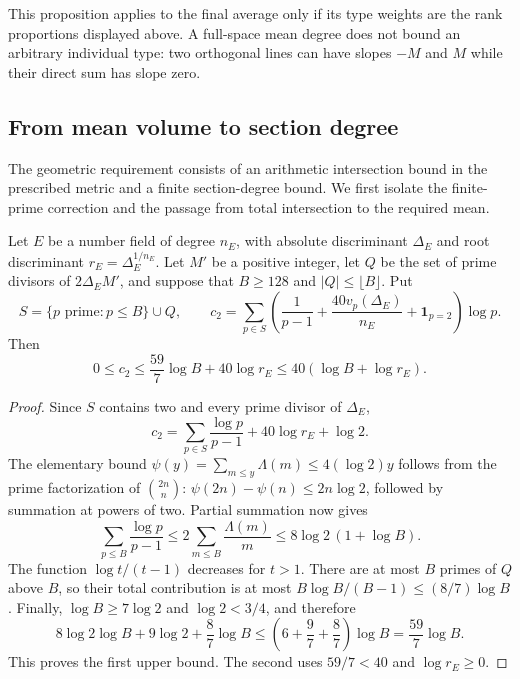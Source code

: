 This proposition applies to the final average only if its type weights
are the rank proportions displayed above. A full-space mean degree
does not bound an arbitrary individual type: two orthogonal lines can
have slopes $-M$ and $M$ while their direct sum has slope zero.














\subsection{From mean volume to section degree}

The geometric requirement consists of an arithmetic intersection bound
in the prescribed metric and a finite section-degree bound. We first
isolate the finite-prime correction and the passage from total
intersection to the required mean.

\begin{lemma}
\label{cs-mean-volume-prime-cost}
Let $E$ be a number field of degree $n_E$, with absolute discriminant
$\Delta_E$ and root discriminant $r_E=\Delta_E^{1/n_E}$. Let $M'$ be a
positive integer, let $Q$ be the set of prime divisors of $2\Delta_E M'$,
and suppose that $B\ge128$ and $|Q|\le\lfloor B\rfloor$. Put
\[
 S=\{p\text{ prime}:p\le B\}\cup Q,\qquad
 c_2=\sum_{p\in S}\left(\frac1{p-1}
       +\frac{40v_p(\Delta_E)}{n_E}+\mathbf1_{p=2}\right)\log p.
\]
Then
\begin{equation}
\label{eq:mean-volume-prime-cost}
 0\le c_2\le\frac{59}{7}\log B+40\log r_E
                      \le40(\log B+\log r_E).
\end{equation}
\end{lemma}

\begin{proof}
Since $S$ contains two and every prime divisor of $\Delta_E$,
\[
 c_2=\sum_{p\in S}\frac{\log p}{p-1}+40\log r_E+\log2.
\]
The elementary bound $\psi(y)=\sum_{m\le y}\Lambda(m)\le4(\log2)y$
follows from the prime factorization of $\binom{2n}{n}$:
$\psi(2n)-\psi(n)\le2n\log2$, followed by summation at powers of two.
Partial summation now gives
\[
 \sum_{p\le B}\frac{\log p}{p-1}
 \le2\sum_{m\le B}\frac{\Lambda(m)}m
 \le8\log2\,(1+\log B).
\]
The function $\log t/(t-1)$ decreases for $t>1$. There are at most
$B$ primes of $Q$ above $B$, so their total contribution is at most
$B\log B/(B-1)\le(8/7)\log B$. Finally,
$\log B\ge7\log2$ and $\log2<3/4$, and therefore
\[
 8\log2\log B+9\log2+\frac87\log B
 \le\left(6+\frac97+\frac87\right)\log B
 =\frac{59}{7}\log B.
\]
This proves the first upper bound. The second uses $59/7<40$ and
$\log r_E\ge0$.
\end{proof}

